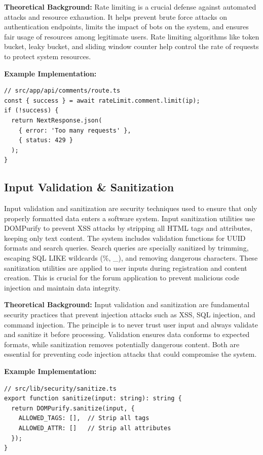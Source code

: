 \textbf{Theoretical Background:} Rate limiting is a crucial defense against automated attacks and resource exhaustion. It helps prevent brute force attacks on authentication endpoints, limits the impact of bots on the system, and ensures fair usage of resources among legitimate users. Rate limiting algorithms like token bucket, leaky bucket, and sliding window counter help control the rate of requests to protect system resources.

\textbf{Example Implementation:}
\begin{verbatim}
// src/app/api/comments/route.ts
const { success } = await rateLimit.comment.limit(ip);
if (!success) {
  return NextResponse.json(
    { error: 'Too many requests' },
    { status: 429 }
  );
}
\end{verbatim}

\subsection{Input Validation \& Sanitization}

Input validation and sanitization are security techniques used to ensure that only properly formatted data enters a software system. Input sanitization utilities use DOMPurify to prevent XSS attacks by stripping all HTML tags and attributes, keeping only text content. The system includes validation functions for UUID formats and search queries. Search queries are specially sanitized by trimming, escaping SQL LIKE wildcards (\%, \_), and removing dangerous characters. These sanitization utilities are applied to user inputs during registration and content creation. This is crucial for the forum application to prevent malicious code injection and maintain data integrity.

\textbf{Theoretical Background:} Input validation and sanitization are fundamental security practices that prevent injection attacks such as XSS, SQL injection, and command injection. The principle is to never trust user input and always validate and sanitize it before processing. Validation ensures data conforms to expected formats, while sanitization removes potentially dangerous content. Both are essential for preventing code injection attacks that could compromise the system.

\textbf{Example Implementation:}
\begin{verbatim}
// src/lib/security/sanitize.ts
export function sanitize(input: string): string {
  return DOMPurify.sanitize(input, {
    ALLOWED_TAGS: [],  // Strip all tags
    ALLOWED_ATTR: []   // Strip all attributes
  });
}
\end{verbatim}

